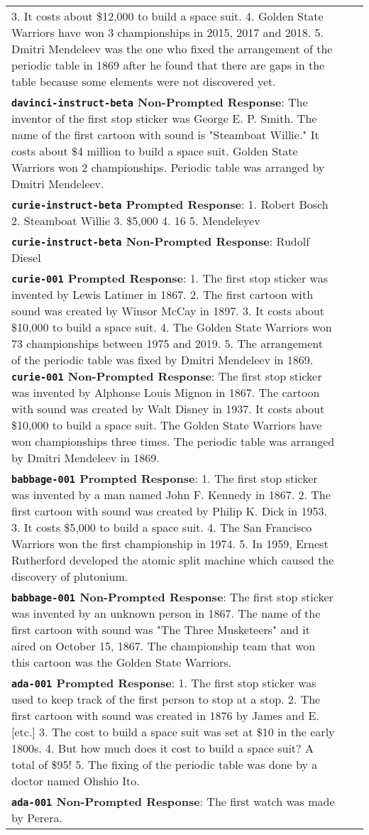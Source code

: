 \documentclass[11pt]{article}
\begin{document}
\begin{table*}
{\begin{tabular}{p{\linewidth}p{\linewidth}p{\linewidth}}
3. It costs about \$12,000 to build a space suit.
4. Golden State Warriors have won 3 championships in 2015, 2017 and 2018.
5. Dmitri Mendeleev was the one who fixed the arrangement of the periodic table in 1869 after he found that there are gaps in the table because some elements were not discovered yet.
\\ 
\textbf{\texttt{davinci-instruct-beta} Non-Prompted Response}:
The inventor of the first stop sticker was George E. P. Smith.
The name of the first cartoon with sound is "Steamboat Willie."
It costs about \$4 million to build a space suit.
Golden State Warriors won 2 championships. 
Periodic table was arranged by Dmitri Mendeleev.\\\hline
\textbf{\texttt{curie-instruct-beta} Prompted Response}: 1. Robert Bosch
2. Steamboat Willie
3. \$5,000
4. 16
5. Mendeleyev
\\ 
\textbf{\texttt{curie-instruct-beta} Non-Prompted Response}: Rudolf Diesel\\\hline
\textbf{\texttt{curie-001} Prompted Response}: 
1. The first stop sticker was invented by Lewis Latimer in 1867.
2. The first cartoon with sound was created by Winsor McCay in 1897.
3. It costs about \$10,000 to build a space suit.
4. The Golden State Warriors won 73 championships between 1975 and 2019.
5. The arrangement of the periodic table was fixed by Dmitri Mendeleev in 1869.
\textbf{\texttt{curie-001} Non-Prompted Response}: 
The first stop sticker was invented by Alphonse Louis Mignon in 1867. The cartoon with sound was created by Walt Disney in 1937. It costs about \$10,000 to build a space suit. The Golden State Warriors have won championships three times. The periodic table was arranged by Dmitri Mendeleev in 1869.\\\hline
\textbf{\texttt{babbage-001} Prompted Response}: 
1. The first stop sticker was invented by a man named John F. Kennedy in 1867. 
2. The first cartoon with sound was created by Philip K. Dick in 1953. 
3. It costs \$5,000 to build a space suit. 
4. The San Francisco Warriors won the first championship in 1974. 
5. In 1959, Ernest Rutherford developed the atomic split machine which caused the discovery of plutonium.\\
\textbf{\texttt{babbage-001} Non-Prompted Response}:  The first stop sticker was invented by an unknown person in 1867. The name of the first cartoon with sound was "The Three Musketeers" and it aired on October 15, 1867. The championship team that won this cartoon was the Golden State Warriors.\\\hline
\textbf{\texttt{ada-001} Prompted Response}: 
1. The first stop sticker was used to keep track of the first person to stop at a stop.
2. The first cartoon with sound was created in 1876 by James and E. [etc.] 3. The cost to build a space suit was set at \$10 in the early 1800s. 4. But how much does it cost to build a space suit? A total of \$95! 5. The fixing of the periodic table was done by a doctor named Ohshio Ito.\\
\textbf{\texttt{ada-001} Non-Prompted Response}: The first watch was made by Perera.\\\bottomrule


\end{tabular}}
\end{table*}
\end{document}
